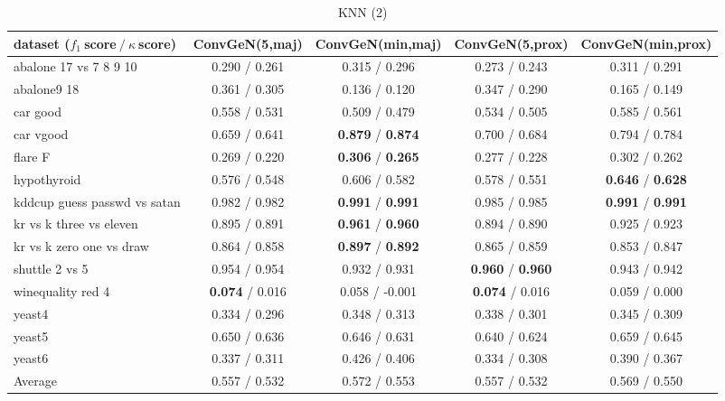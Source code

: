 \begin{table*}[ht]\scriptsize\caption{KNN (2)}\label{tab:results:KNN:B}\centering\tabularnewline
\begin{tabular}{l|@{\hskip3pt}c@{\hskip3pt}|@{\hskip3pt}c@{\hskip3pt}|@{\hskip3pt}c@{\hskip3pt}|@{\hskip3pt}c@{\hskip3pt}}\hline
\textbf{dataset ($f_1~$score$~/~\kappa~$score)} & \textbf{ConvGeN(5,maj)} & \textbf{ConvGeN(min,maj)} & \textbf{ConvGeN(5,prox)} & \textbf{ConvGeN(min,prox)}
\tabularnewline
\hline
abalone 17 vs 7 8 9 10 &  0.290  /  0.261  &  0.315  /  0.296  &  0.273  /  0.243  &  0.311  /  0.291 
\tabularnewline
abalone9 18 &  0.361  /  0.305  &  0.136  /  0.120  &  0.347  /  0.290  &  0.165  /  0.149 
\tabularnewline
car good &  0.558  /  0.531  &  0.509  /  0.479  &  0.534  /  0.505  &  0.585  /  0.561 
\tabularnewline
car vgood &  0.659  /  0.641  &  \textbf{0.879}  /  \textbf{0.874}  &  0.700  /  0.684  &  0.794  /  0.784 
\tabularnewline
flare F &  0.269  /  0.220  &  \textbf{0.306}  /  \textbf{0.265}  &  0.277  /  0.228  &  0.302  /  0.262 
\tabularnewline
hypothyroid &  0.576  /  0.548  &  0.606  /  0.582  &  0.578  /  0.551  &  \textbf{0.646}  /  \textbf{0.628} 
\tabularnewline
kddcup guess passwd vs satan &  0.982  /  0.982  &  \textbf{0.991}  /  \textbf{0.991}  &  0.985  /  0.985  &  \textbf{0.991}  /  \textbf{0.991} 
\tabularnewline
kr vs k three vs eleven &  0.895  /  0.891  &  \textbf{0.961}  /  \textbf{0.960}  &  0.894  /  0.890  &  0.925  /  0.923 
\tabularnewline
kr vs k zero one vs draw &  0.864  /  0.858  &  \textbf{0.897}  /  \textbf{0.892}  &  0.865  /  0.859  &  0.853  /  0.847 
\tabularnewline
shuttle 2 vs 5 &  0.954  /  0.954  &  0.932  /  0.931  &  \textbf{0.960}  /  \textbf{0.960}  &  0.943  /  0.942 
\tabularnewline
winequality red 4 &  \textbf{0.074}  /  0.016  &  0.058  /  -0.001  &  \textbf{0.074}  /  0.016  &  0.059  /  0.000 
\tabularnewline
yeast4 &  0.334  /  0.296  &  0.348  /  0.313  &  0.338  /  0.301  &  0.345  /  0.309 
\tabularnewline
yeast5 &  0.650  /  0.636  &  0.646  /  0.631  &  0.640  /  0.624  &  0.659  /  0.645 
\tabularnewline
yeast6 &  0.337  /  0.311  &  0.426  /  0.406  &  0.334  /  0.308  &  0.390  /  0.367 
\tabularnewline
\hline Average &  0.557  /  0.532  &  0.572  /  0.553  &  0.557  /  0.532  &  0.569  /  0.550 
\tabularnewline
\hline\end{tabular}\end{table*}



